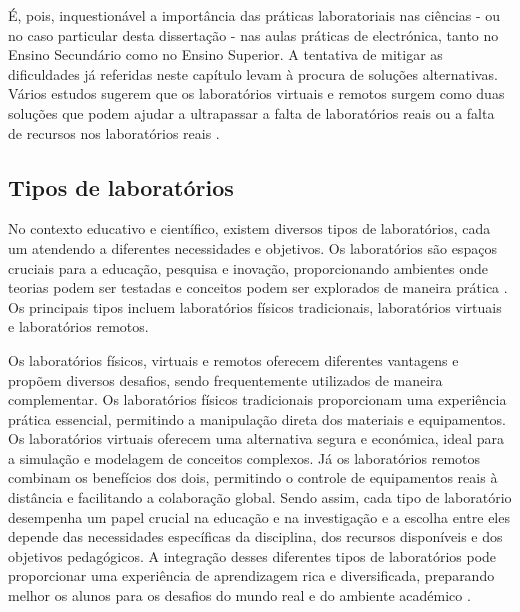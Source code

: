 É, pois, inquestionável a importância das práticas laboratoriais nas ciências - ou no caso particular desta dissertação - nas aulas práticas de electrónica, tanto no Ensino Secundário como no Ensino Superior. A tentativa de mitigar as dificuldades já referidas neste capítulo levam à procura de soluções alternativas. Vários estudos sugerem que os laboratórios virtuais e remotos surgem como duas soluções que podem ajudar a ultrapassar a falta de laboratórios reais ou a falta de recursos nos laboratórios reais \cite{ImpactRemoteLabTeachingPractices, developremotelabs, HERADIO20161, POTKONJAK2016309}.


\subsection{Tipos de laboratórios} %
\label{sec:tiposlaboratorios}
No contexto educativo e científico, existem diversos tipos de laboratórios, cada um atendendo a diferentes necessidades e objetivos. Os laboratórios são espaços cruciais para a educação, pesquisa e inovação, proporcionando ambientes onde teorias podem ser testadas e conceitos podem ser explorados de maneira prática \cite{Hofsteinfoundations}. Os principais tipos incluem laboratórios físicos tradicionais, laboratórios virtuais e laboratórios remotos.

Os laboratórios físicos, virtuais e remotos oferecem diferentes vantagens e propõem diversos desafios, sendo frequentemente utilizados de maneira complementar. Os laboratórios físicos tradicionais proporcionam uma experiência prática essencial, permitindo a manipulação direta dos materiais e equipamentos. Os laboratórios virtuais oferecem uma alternativa segura e económica, ideal para a simulação e modelagem de conceitos complexos. Já os laboratórios remotos combinam os benefícios dos dois, permitindo o controle de equipamentos reais à distância e facilitando a colaboração global. Sendo assim, cada tipo de laboratório desempenha um papel crucial na educação e na investigação e a escolha entre eles depende das necessidades específicas da disciplina, dos recursos disponíveis e dos objetivos pedagógicos. A integração desses diferentes tipos de laboratórios pode proporcionar uma experiência de aprendizagem rica e diversificada, preparando melhor os alunos para os desafios do mundo real e do ambiente académico \cite{BRINSON2015218, ImpactRemoteLabTeachingPractices, Hofsteinfoundations}.

